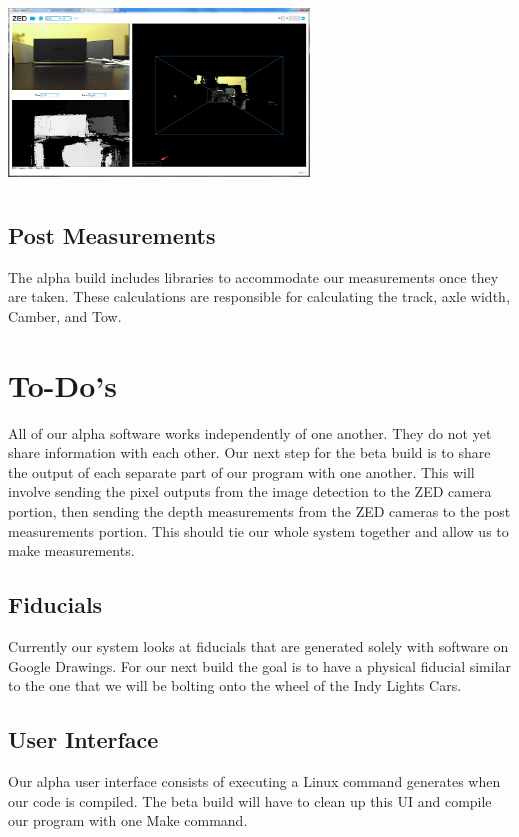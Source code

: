 \documentclass[onecolumn, draftclsnofoot,10pt, compsoc]{IEEEtran}
\begin{document}
\includegraphics[width=8cm, height=5cm]{images/ZED.png}

\subsection{Post Measurements}
The alpha build includes libraries to accommodate our measurements once they are taken.  These calculations are responsible for calculating the track, axle width, Camber, and Tow.


\section{To-Do's}
All of our alpha software works independently of one another.  They do not yet share information with each other.  Our next step for the beta build is to share the output of each separate part of our program with one another.  This will involve sending the pixel outputs from the image detection to the ZED camera portion, then sending the depth measurements from the ZED cameras to the post measurements portion.  This should tie our whole system together and allow us to make measurements.

\subsection{Fiducials}
Currently our system looks at fiducials that are generated solely with software on Google Drawings.  For our next build the goal is to have a physical fiducial similar to the one that we will be bolting onto the wheel of the Indy Lights Cars.

\subsection{User Interface}
Our alpha user interface consists of executing a Linux command generates when our code is compiled.  The beta build will have to clean up this UI and compile our program with one Make command.
\end{document}
